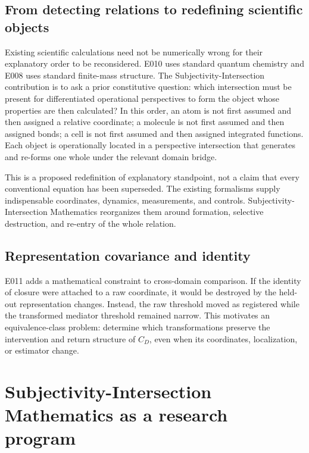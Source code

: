 \documentclass[11pt,a4paper]{article}
\begin{document}
\subsection{From detecting relations to redefining scientific objects}

Existing scientific calculations need not be numerically wrong for their explanatory order to be reconsidered. E010 uses standard quantum chemistry and E008 uses standard finite-mass structure. The Subjectivity-Intersection contribution is to ask a prior constitutive question: which intersection must be present for differentiated operational perspectives to form the object whose properties are then calculated? In this order, an atom is not first assumed and then assigned a relative coordinate; a molecule is not first assumed and then assigned bonds; a cell is not first assumed and then assigned integrated functions. Each object is operationally located in a perspective intersection that generates and re-forms one whole under the relevant domain bridge.

This is a proposed redefinition of explanatory standpoint, not a claim that every conventional equation has been superseded. The existing formalisms supply indispensable coordinates, dynamics, measurements, and controls. Subjectivity-Intersection Mathematics reorganizes them around formation, selective destruction, and re-entry of the whole relation.

\subsection{Representation covariance and identity}

E011 adds a mathematical constraint to cross-domain comparison. If the identity of closure were attached to a raw coordinate, it would be destroyed by the held-out representation changes. Instead, the raw threshold moved as registered while the transformed mediator threshold remained narrow. This motivates an equivalence-class problem: determine which transformations preserve the intervention and return structure of $C_D$, even when its coordinates, localization, or estimator change.

\section{Subjectivity-Intersection Mathematics as a research program}
\end{document}
